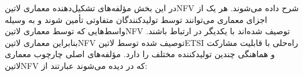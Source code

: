 \documentclass{book}
\begin{document}

در این بخش مؤلفه‌های تشکیل‌دهنده معماری ‌لاتین{NFV} شرح داده می‌شوند.
هر یک از اجزای معماری می‌توانند توسط تولیدکنندگان متفاوتی تأمین شوند و به وسیله واسط‌هایی که توسط معماری ‌لاتین{NFV} توصیف شده‌اند
با یکدیگر در ارتباط باشند.
بنابراین معماری ‌لاتین{NFV} توصیف شده توسط ‌لاتین{ETSI} راه‌حلی با قابلیت مشارکت و هماهنگی چندین تولیدکننده مختلف را دارد.
مؤلفه‌های اصلی چارچوب معماری ‌لاتین{NFV} که در  دیده می‌شوند عبارتند از:
\end{document}
